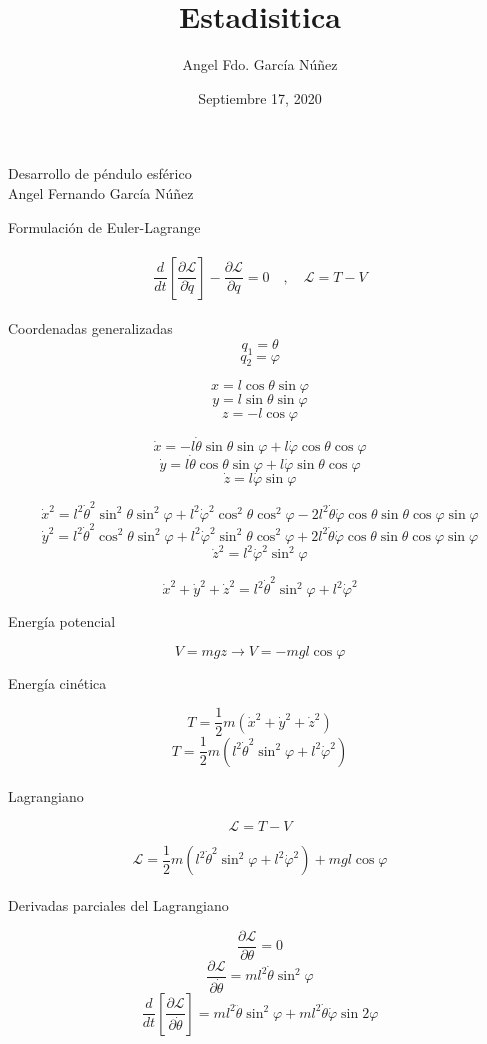 \documentclass[10pt,a4papper]{article}
\author{Angel Fdo. García Núñez}
\date{Septiembre 17, 2020}
\title{Estadisitica}
\begin{document}
\Huge
Desarrollo de péndulo esférico\\

Angel Fernando García Núñez

\newpage
\LARGE
Formulación de Euler-Lagrange\\\\
\Large
\[\frac{d}{dt}\left[\frac{\partial\mathcal{L}}{\partial\dot q}\right]-\frac{\partial\mathcal{L}}{\partial q}=0\quad,\quad\mathcal{L}=T-V\]\\

Coordenadas generalizadas
\[q_1=\theta\]
\[q_2=\varphi\]

\[x=l\cos\theta\sin\varphi\]
\[y=l\sin\theta\sin\varphi\]
\[z=-l\cos\varphi\]

\[\dot x=-l\dot\theta\sin\theta\sin\varphi+l\dot\varphi\cos\theta\cos\varphi\]
\[\dot y=l\dot\theta\cos\theta\sin\varphi+l\dot\varphi\sin\theta\cos\varphi\]
\[\dot z=l\dot\varphi\sin\varphi\]

\[\dot x^2=l^2\dot\theta^2\sin^2\theta\sin^2\varphi+l^2\dot\varphi^2\cos^2\theta\cos^2\varphi-2l^2\dot\theta\dot\varphi\cos\theta\sin\theta\cos\varphi\sin\varphi\]
\[\dot y^2=l^2\dot\theta^2\cos^2\theta\sin^2\varphi+l^2\dot\varphi^2\sin^2\theta\cos^2\varphi+2l^2\dot\theta\dot\varphi\cos\theta\sin\theta\cos\varphi\sin\varphi\]
\[\dot z^2=l^2\dot\varphi^2\sin^2\varphi\]

\[\dot x^2+\dot y^2+\dot z^2=l^2\dot\theta^2\sin^2\varphi+l^2\dot\varphi^2\]

\newpage
Energía potencial

\[V=mgz\to V=-mgl\cos\varphi\]

Energía cinética

\[T=\frac{1}{2}m(\dot x^2+\dot y^2+\dot z^2)\]
\[T=\frac{1}{2}m(l^2\dot\theta^2\sin^2\varphi+l^2\dot\varphi^2)\]\\
  
Lagrangiano

\[\mathcal{L}=T-V\]

\[\mathcal{L}=\frac{1}{2}m(l^2\dot\theta^2\sin^2\varphi+l^2\dot\varphi^2)+mgl\cos\varphi\]\\

Derivadas parciales del Lagrangiano

\[\frac{\partial\mathcal{L}}{\partial\theta}=0\]
\[\frac{\partial\mathcal{L}}{\partial\dot\theta}=ml^2\dot\theta\sin^2\varphi\]
\[\frac{d}{dt}\left[\frac{\partial\mathcal{L}}{\partial\dot\theta}\right]=ml^2\ddot\theta\sin^2\varphi+ml^2\dot\theta\dot\varphi\sin2\varphi\]\\
\end{document}
